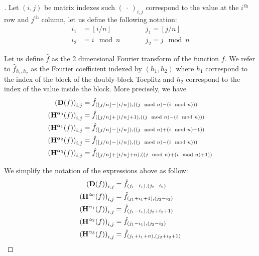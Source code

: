 \begin{proof}[]
Let $(i, j)$ be matrix indexes such $(\ \cdot\ )_{i, j}$ correspond to the value at the $i^\textrm{th}$ row and $j^\textrm{th}$ column, let us define the following notation:
\begin{align*}
    i_1 &= \left\lfloor i/n \right\rfloor \quad \quad &&j_1 = \left\lfloor j/n \right\rfloor \\
    i_2 &= i \mod n \quad \quad &&j_2 = j \mod n
\end{align*}

Let us define $\hat{f}$ as the 2 dimensional Fourier transform of the function $f$. We refer to $\hat{f}_{h_1, h_2}$ as the Fourier coefficient indexed by $(h_1, h_2)$ where $h_1$ correspond to the index of the block of the doubly-block Toeplitz and $h_2$ correspond to the index of the value inside the block. More precisely, we have 
\begin{align}
    \leftmat \Dmat(f) \rightmat_{i, j} &= \hat{f}_{(\left\lfloor j/n \right\rfloor - \left\lfloor i/n \right\rfloor), ((j \mod n) - (i \mod n)))} \label{equation:expression_fourier} \\
    \leftmat \Hmat^{\alpha_0}(f) \rightmat_{i, j} &= \hat{f}_{(\left\lfloor j/n \right\rfloor + \left\lfloor i/n \right\rfloor + 1), ((j \mod n) - (i \mod n)))} \\
    \leftmat \Hmat^{\alpha_1}(f) \rightmat_{i, j} &= \hat{f}_{(\left\lfloor j/n \right\rfloor - \left\lfloor i/n \right\rfloor), ((j \mod n) + (i \mod n) + 1))} \\
    \leftmat \Hmat^{\alpha_2}(f) \rightmat_{i, j} &= \hat{f}_{(\left\lfloor j/n \right\rfloor - \left\lfloor i/n \right\rfloor), ((j \mod n) - (i \mod n)))} \\
    \leftmat \Hmat^{\alpha_3}(f) \rightmat_{i, j} &= \hat{f}_{(\left\lfloor j/n \right\rfloor + \left\lfloor i/n \right\rfloor + n), ((j \mod n) + (i \mod n) + 1))}
\end{align}

We simplify the notation of the expressions above as follow:
\begin{align}
    \leftmat \Dmat(f) \rightmat_{i, j} &= \hat{f}_{(j_1 - i_1), (j_2 - i_2 )} \\
    \leftmat \Hmat^{\alpha_0}(f) \rightmat_{i, j} &= \hat{f}_{(j_1 + i_1 + 1), (j_2 - i_2 )} \\
    \leftmat \Hmat^{\alpha_1}(f) \rightmat_{i, j} &= \hat{f}_{(j_1 - i_1), (j_2 + i_2 + 1)} \\
    \leftmat \Hmat^{\alpha_2}(f) \rightmat_{i, j} &= \hat{f}_{(j_1 - i_1), (j_2 - i_2 )} \\
    \leftmat \Hmat^{\alpha_3}(f) \rightmat_{i, j} &= \hat{f}_{(j_1 + i_1 + n), (j_2 + i_2 + 1)}
\end{align}


\end{proof}
